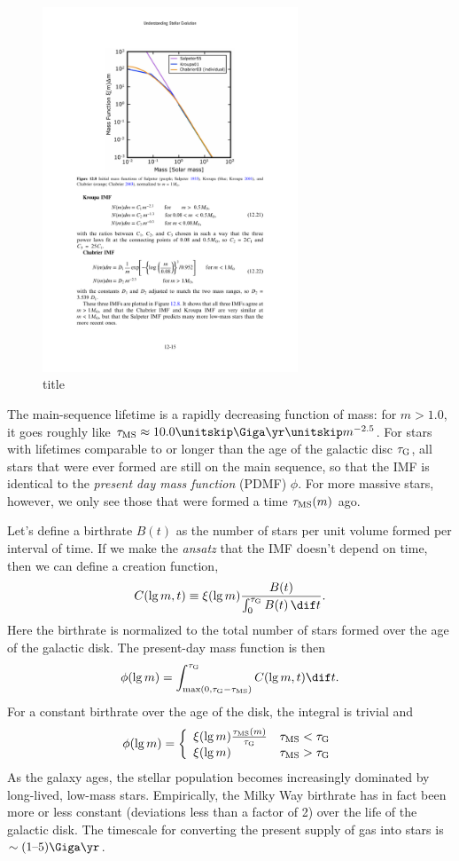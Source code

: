 \begin{figure}[htbp]\caption{title}
  \includegraphics[width=3in]{star-formation/figs/imf}
\end{figure}
The main-sequence lifetime is a rapidly decreasing function of mass: for $m > 1.0$, it goes roughly like $\tms \approx 10.0\nsp\Giga\yr\nsp m^{-2.5}$. For stars with lifetimes comparable to or longer than the age of the galactic disc $\tau_{\mathrm{G}}$, all stars that were ever formed are still on the main sequence, so that the IMF is identical to  the \emph{present day mass function} (PDMF) $\phi$.  For more massive stars, however, we only see those that were formed a time $\tau_{\mathrm{MS}}(m)$ ago.

Let's define a birthrate $B(t)$ as the number of stars per unit volume formed per interval of time.  If we make the \emph{ansatz} that the IMF doesn't depend on time, then we can define a creation function,
\begin{equation}\label{e.creation-fcn}
C(\lg m,t) \equiv \xi(\lg m)\frac{B(t)}{\int_{0}^{\tauG} B(t)\,\dif t}.
\end{equation}
Here the birthrate is normalized to the total number of stars formed over the age of the galactic disk. The present-day mass function is then
\[
	\phi(\lg m) = \int_{\max(0,\tauG-\tms)}^{\tauG} C(\lg m,t) \dif t.
\]
For a constant birthrate over the age of the disk, the integral is trivial and
\[
	\phi(\lg m) = \left\{\begin{array}{lr}\xi(\lg m)\frac{\tau_{\mathrm{MS}}(m)}{\tau_{\mathrm{G}}} & \tau_{\mathrm{MS}} < \tau_{\mathrm{G}} \\
		\xi(\lg m) & \tau_{\mathrm{MS}} > \tau_{\mathrm{G}}\end{array}\right.
\]
As the galaxy ages, the stellar population becomes increasingly dominated by long-lived, low-mass stars.
Empirically, the Milky Way birthrate has in fact been more or less constant (deviations less than a factor of 2) over the life of the galactic disk.  The timescale for converting the present supply of gas into stars is $\sim (1\textrm{--}5)\Giga\yr$.

